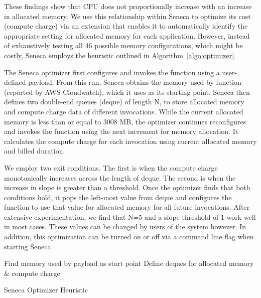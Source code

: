 These findings show that CPU does not proportionally increase with
an increase in allocated memory.  We use this relationship within
Seneca to optimize its cost (compute charge) via an extension
that enables it to automatically identify the appropriate
setting for allocated memory for each application.
However, instead of exhaustively testing all 46 possible 
memory configurations, which might be costly,  
Seneca employs the heuristic outlined in
Algorithm~\ref{algo:optimizer}. 

The Seneca optimizer first configures and invokes the function using 
a user-defined payload.  From this run, Seneca obtains the memory 
used by function (reported by AWS Cloudwatch), 
which it uses as its starting point.
Seneca then defines two double-end queues 
(deque) of length N, to store 
allocated memory and compute charge data of different
invocations. While the current 
allocated memory is less than or equal to 3008 MB, 
the optimizer continues reconfigures and invokes the function 
using the next increment for memory allocation.  It 
calculates the compute charge for each invocation 
using current allocated memory and billed duration. 

We employ two exit conditions.  The first is when the 
compute charge monotonically increases across the length of deque. 
The second is when the increase in slope is greater than a threshold. 
Once the optimizer finds that both conditions hold, 
it pops the left-most value from deque and configures 
the function to use that value for allocated memory for all future invocations.
After extensive experimentation, we find that 
N=5 and a slope threshold of 1 work well in most cases.
These values can be changed by users of the system however.
In addition, this optimization can be turned on or off via a command line
flag when starting Seneca.

\begin{algorithm}[]
\SetAlgoLined
{}
Find memory used by payload as start point\;
Define deques for allocated memory \& compute charge\;
 \caption{Seneca Optimizer Heuristic}
 \label{algo:optimizer}
\end{algorithm}

